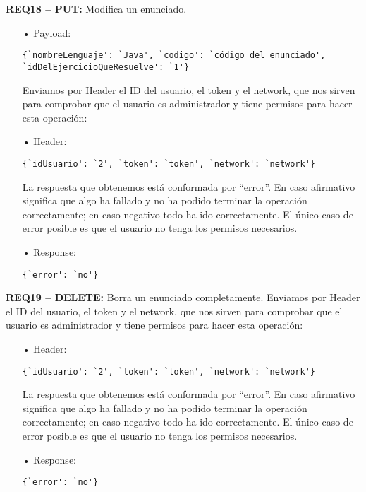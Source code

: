 \textbf{REQ18 – PUT:} Modifica un enunciado.

\begin{itemize}
\item[•]
Payload: 
{\codesize
\begin{verbatim}
{`nombreLenguaje': `Java', `codigo': `código del enunciado', 
`idDelEjercicioQueResuelve': `1'}
\end{verbatim}
}

Enviamos por Header el ID del usuario, el token y el network, que nos sirven para comprobar que el usuario es administrador y tiene permisos para hacer esta operación:
\item[•]
Header: 
{\codesize
\begin{verbatim}
{`idUsuario': `2', `token': `token', `network': `network'}
\end{verbatim}
}

La respuesta que obtenemos está conformada por ``error''. En caso afirmativo significa que algo ha fallado y no ha podido terminar la operación correctamente; en caso negativo todo ha ido correctamente. El único caso de error posible es que el usuario no tenga los permisos necesarios.
\item[•]
Response: 
{\codesize
\begin{verbatim}
{`error': `no'}
\end{verbatim}
}
\end{itemize}

\textbf{REQ19 – DELETE:} Borra un enunciado completamente. Enviamos por Header el ID del usuario, el token y el network, que nos sirven para comprobar que el usuario es administrador y tiene permisos para hacer esta operación:
\begin{itemize}
\item[•]
Header:
{\codesize
\begin{verbatim} 
{`idUsuario': `2', `token': `token', `network': `network'}
\end{verbatim}
}

La respuesta que obtenemos está conformada por ``error''. En caso afirmativo significa que algo ha fallado y no ha podido terminar la operación correctamente; en caso negativo todo ha ido correctamente. El único caso de error posible es que el usuario no tenga los permisos necesarios.
\item[•]
Response: 
{\codesize
\begin{verbatim}
{`error': `no'}
\end{verbatim}
}
\end{itemize}

